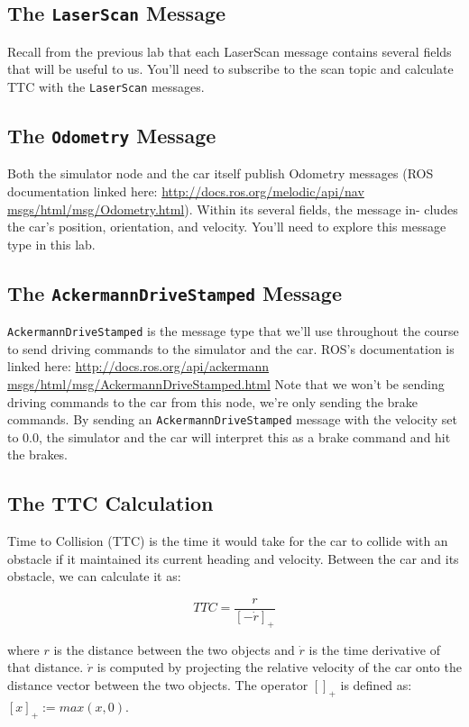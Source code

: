 \documentclass[letta4 paper]{article}
\numberwithin{equation}{section}
\newcommand{\0}{\mathbf{0}}
\begin{document}
	\subsection{The \texttt{LaserScan} Message}
	
	Recall from the previous lab that each LaserScan message contains several fields that will be useful to us. You’ll need to subscribe to the scan topic and calculate TTC with the \texttt{LaserScan} messages.
	
	\subsection{The \texttt{Odometry} Message}
	
	Both the simulator node and the car itself publish Odometry messages (ROS documentation linked here: \url{http://docs.ros.org/melodic/api/nav msgs/html/msg/Odometry.html}). Within its several fields, the message in- cludes the car’s position, orientation, and velocity. You’ll need to explore this message type in this lab.
	
	\subsection{The \texttt{AckermannDriveStamped} Message}
	
	\texttt{AckermannDriveStamped} is the message type that we’ll use throughout the course to send driving commands to the simulator and the car. ROS’s documentation is linked here:
	\url{http://docs.ros.org/api/ackermann msgs/html/msg/AckermannDriveStamped.html}
	Note that we won’t be sending driving commands to the car from this node, we’re only sending the brake commands. By sending an \texttt{AckermannDriveStamped} message with the velocity set to 0.0, the simulator and the car will interpret this as a brake command and hit the brakes.
	
	\subsection{The TTC Calculation}
	
	Time to Collision (TTC) is the time it would take for the car to collide with an obstacle if it maintained its current heading and velocity. Between the car and its obstacle, we can calculate it as:
	
	\[
	TTC = \frac{r}{[-\dot{r}]_+} 
	\]	
	
	where \(r\) is the distance between the two objects and \(\dot{r}\) is the time derivative of that distance. \(\dot{r}\) is computed by projecting the relative velocity of the car onto the distance vector between the two objects. The operator \([ ]_+\) is defined as: \([x]_+ := max(x,0)\).
	
\end{document}
